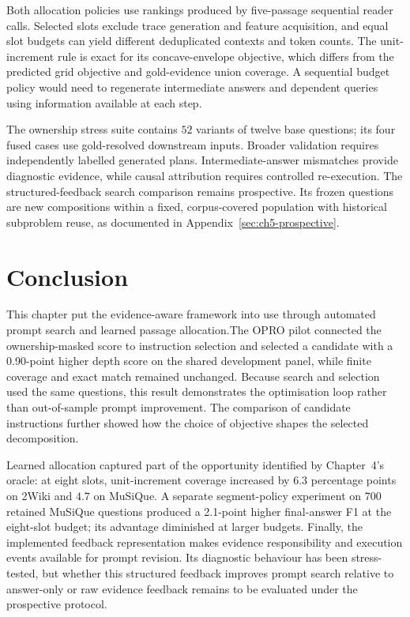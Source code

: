 Both allocation policies use rankings produced by five-passage sequential
reader calls. Selected slots exclude trace generation and feature acquisition,
and equal slot budgets can yield different deduplicated contexts and token
counts. The unit-increment rule is exact for its concave-envelope objective,
which differs from the predicted grid objective and gold-evidence union
coverage. A sequential budget policy would need to regenerate intermediate
answers and dependent queries using information available at each step.

The ownership stress suite contains $52$ variants of twelve base questions;
its four fused cases use gold-resolved downstream inputs. Broader validation
requires independently labelled generated plans. Intermediate-answer
mismatches provide diagnostic evidence, while causal attribution requires
controlled re-execution. The structured-feedback search comparison remains
prospective. Its frozen questions are new compositions within a fixed,
corpus-covered population with historical subproblem reuse, as documented
in Appendix~\ref{sec:ch5-prospective}.

\section*{Conclusion}

This chapter put the evidence-aware framework into use through automated
prompt search and learned passage allocation.The OPRO pilot connected the ownership-masked score to instruction selection and selected a candidate with a 0.90-point higher depth score on the shared development panel, while finite coverage and exact match remained unchanged. Because search and selection used the same questions, this result demonstrates the optimisation loop rather than out-of-sample prompt improvement. The comparison of candidate instructions further showed
how the choice of objective shapes the selected decomposition.

Learned allocation captured part of the opportunity identified by Chapter~4's
oracle: at eight slots, unit-increment coverage increased by $6.3$ percentage
points on 2Wiki and $4.7$ on MuSiQue. A separate segment-policy experiment on 700 retained MuSiQue questions produced a 2.1-point higher final-answer F1 at the eight-slot budget; its advantage diminished at larger budgets.
Finally, the implemented feedback representation makes evidence responsibility and execution events available for prompt revision. Its diagnostic behaviour has been stress-tested, but whether this structured feedback improves prompt search relative to answer-only or raw evidence feedback remains to be evaluated under the prospective protocol.

